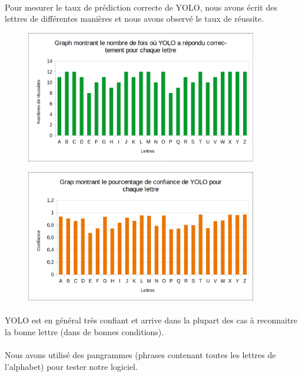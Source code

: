 \documentclass[a4paper]{article}
\begin{document}
			\paragraph{} Pour mesurer le taux de prédiction correcte de YOLO, nous avons écrit des lettres de différentes manières et nous avons observé le taux de réussite.
			\begin{figure}[H]
				\includegraphics[width=0.9\textwidth]{grapYoloReussite.png}
				\centering
				\label{fig:graph:reussite}
			\end{figure}
			\begin{figure}[H]
				\includegraphics[width=0.9\textwidth]{grapYoloConfiance.png}
				\centering
				\label{fig:graph:confiance}
			\end{figure}
			\paragraph{} YOLO est en général très confiant et arrive dans la plupart des cas à reconnaitre la bonne lettre (dans de bonnes conditions).
		
			\paragraph{} Nous avons utilisé des pangrammes (phrases contenant toutes les lettres de l'alphabet) pour tester notre logiciel.
			
\end{document}
